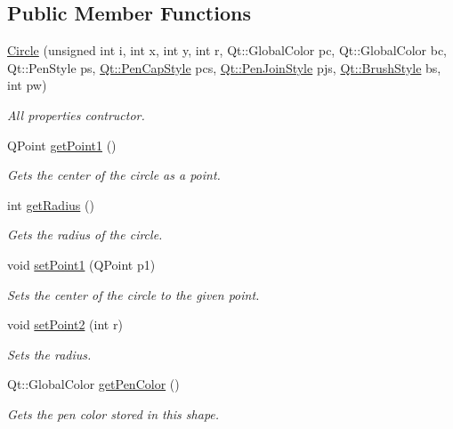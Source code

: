 \subsection*{Public Member Functions}
\begin{DoxyCompactItemize}
\item 
\hyperlink{classCircle_a40e653e2eecf4335d2125c97700dff3c}{Circle} (unsigned int i, int x, int y, int r, Qt\+::\+Global\+Color pc, Qt\+::\+Global\+Color bc, Qt\+::\+Pen\+Style ps, \hyperlink{shape__input__file__specs_8txt_a622efdcfef6789d4367974d2fe79019e}{Qt\+::\+Pen\+Cap\+Style} pcs, \hyperlink{shape__input__file__specs_8txt_a007db2043c6063881de2043c05c9c4a9}{Qt\+::\+Pen\+Join\+Style} pjs, \hyperlink{shape__input__file__specs_8txt_ad07f6fe6c28dcb0b3bdc324a72d0051f}{Qt\+::\+Brush\+Style} bs, int pw)
\begin{DoxyCompactList}\small\item\em All properties contructor. \end{DoxyCompactList}\item 
Q\+Point \hyperlink{classCircle_a363e30a4f7d06116167e77e271955998}{get\+Point1} ()
\begin{DoxyCompactList}\small\item\em Gets the center of the circle as a point. \end{DoxyCompactList}\item 
int \hyperlink{classCircle_adfc2e5e026f5d80215563cc42260a237}{get\+Radius} ()
\begin{DoxyCompactList}\small\item\em Gets the radius of the circle. \end{DoxyCompactList}\item 
void \hyperlink{classCircle_a60e5c24fe969240435725aa608bed3dd}{set\+Point1} (Q\+Point p1)
\begin{DoxyCompactList}\small\item\em Sets the center of the circle to the given point. \end{DoxyCompactList}\item 
void \hyperlink{classCircle_ad1c743962a2fc94b46cc80fbf88705ed}{set\+Point2} (int r)
\begin{DoxyCompactList}\small\item\em Sets the radius. \end{DoxyCompactList}\item 
Qt\+::\+Global\+Color \hyperlink{classCircle_a56a594eac870bedf7c268a024bbd92d3}{get\+Pen\+Color} ()
\begin{DoxyCompactList}\small\item\em Gets the pen color stored in this shape. \end{DoxyCompactList}\item 

\end{DoxyCompactItemize}
